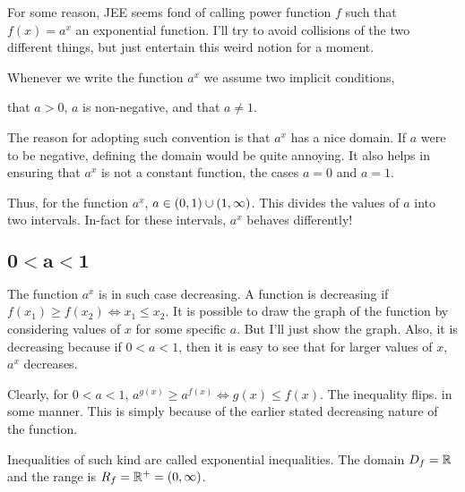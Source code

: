 For some reason, JEE seems fond of calling power function \(f\) such that \(f(x) = a^x\) an 
exponential function. I'll try to avoid collisions of the two different things, but just 
entertain this weird notion for a moment.
\parbreak

Whenever we write the function \(a^x\) we assume two implicit conditions, \begin{inparaenum}[1)]
    \ii that \(a > 0\), \(a\) is non-negative,
    \ii and that \(a \ne 1\).
\end{inparaenum}

The reason for adopting such convention is that \(a^x\) has a nice domain. If \(a\) were to
be negative, defining the domain would be quite annoying. It also helps in ensuring that 
\(a^x\) is not a constant function, the cases \(a = 0\) and \(a = 1\).

Thus, for the function \(a^x\), \(a \in \left(0,1\right) \cup \left(1, \infty\right)\). This
divides the values of \(a\) into two intervals. In-fact for these intervals, \(a^x\) behaves 
differently!

\subsection[Case I]{\(\mathbf{0 < a < 1}\)}

The function \(a^x\) is in such case decreasing. A function is decreasing if \(f(x_1) \ge f(x_2)
\iff x_1 \le x_2\). It is possible to draw the graph of the function by considering
values of \(x\) for some specific \(a\). But I'll just show the graph. Also, it is decreasing 
because if \(0 < a < 1\), then it is easy to see that for larger values of \(x\), \(a^x\) decreases.

\begin{figure}[H]
    \centering
\end{figure}

 Clearly, for \(0 < a < 1\), \(a^{g(x)} \ge a^{f(x)} \iff g(x) \le f(x)\). The inequality flips. 
 in some manner. This is simply because of the earlier stated decreasing nature of the function.
 
 Inequalities of such kind are called exponential inequalities. The domain \(D_f = \mathbb R\) and
 the range is \(R_f = \mathbb R^+ = (0, \infty)\). 

